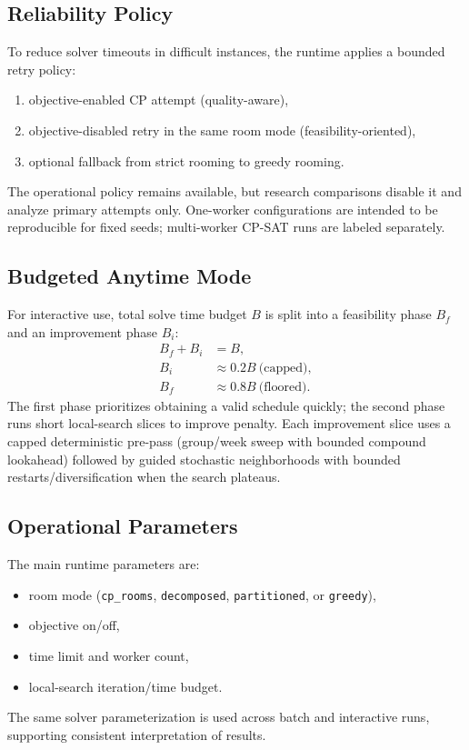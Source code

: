 \subsection{Reliability Policy}
To reduce solver timeouts in difficult instances, the runtime applies a bounded retry policy:
\begin{enumerate}[leftmargin=*]
  \item objective-enabled CP attempt (quality-aware),
  \item objective-disabled retry in the same room mode (feasibility-oriented),
  \item optional fallback from strict rooming to greedy rooming.
\end{enumerate}
The operational policy remains available, but research comparisons disable it and analyze primary attempts only.
One-worker configurations are intended to be reproducible for fixed seeds; multi-worker CP-SAT runs are labeled separately.

\subsection{Budgeted Anytime Mode}
For interactive use, total solve time budget $B$ is split into
a feasibility phase $B_f$ and an improvement phase $B_i$:
\begin{align*}
B_f + B_i &= B,\\
B_i &\approx 0.2B\ \text{(capped)},\\
B_f &\approx 0.8B\ \text{(floored)}.
\end{align*}
The first phase prioritizes obtaining a valid schedule quickly; the second phase runs short local-search slices to improve penalty.
Each improvement slice uses a capped deterministic pre-pass (group/week sweep with bounded compound lookahead) followed by guided stochastic neighborhoods with bounded restarts/diversification when the search plateaus.

\subsection{Operational Parameters}
The main runtime parameters are:
\begin{itemize}[leftmargin=*]
  \item room mode (\texttt{cp\_rooms}, \texttt{decomposed}, \texttt{partitioned}, or \texttt{greedy}),
  \item objective on/off,
  \item time limit and worker count,
  \item local-search iteration/time budget.
\end{itemize}
The same solver parameterization is used across batch and interactive runs, supporting consistent interpretation of results.


